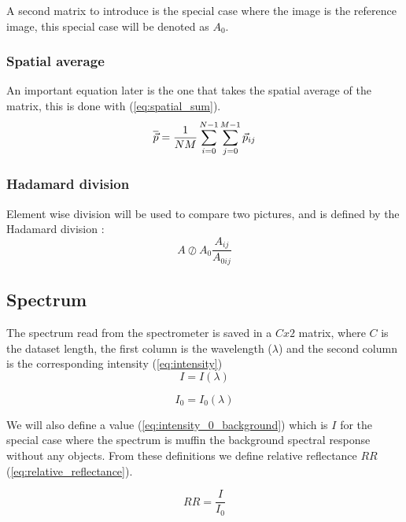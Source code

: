 A second matrix to introduce is the special case where the image is the reference image, this special case will be denoted as $A_0$.

\subsubsection{Spatial average}
\label{sec:spatial_average}

An important equation later is the one that takes the spatial average of the matrix, this is done with (\ref{eq:spatial_sum}).
\begin{equation}
    \label{eq:spatial_sum}
    \overline{\vec{p}} = \frac{1}{NM} \sum_{i=0}^{N-1} \sum_{j=0}^{M-1} \vec{p}_{ij}
\end{equation}


\subsubsection{Hadamard division}
Element wise division will be used to compare two pictures, and is defined by the Hadamard division \cite{HadamardDivisionInfixed}:
\begin{equation}
    \label{eq:element_wise_division_image}
    A \oslash  A_0  \frac{A_{ij}}{A_{0ij} } %
\end{equation}


\subsection{Spectrum}
\label{sec:spectrum}

The spectrum read from the spectrometer is saved in a $C x 2$ matrix, where $C$ is the dataset length, the first column is the wavelength ($\lambda$) and the second column is the corresponding intensity (\ref{eq:intensity})
\begin{equation}
    \label{eq:intensity}
    I = I(\lambda)    
\end{equation}

\begin{equation}
    \label{eq:intensity_0_background}
    I_0 = I_0(\lambda)
\end{equation}

We will also define a value (\ref{eq:intensity_0_background}) which is $I$ for the special case where the spectrum is muffin the background spectral response without any objects. From these definitions we define relative reflectance $RR$ (\ref{eq:relative_reflectance}). 

\begin{equation}
    \label{eq:relative_reflectance}
    RR = \frac{I}{I_0}
\end{equation}


